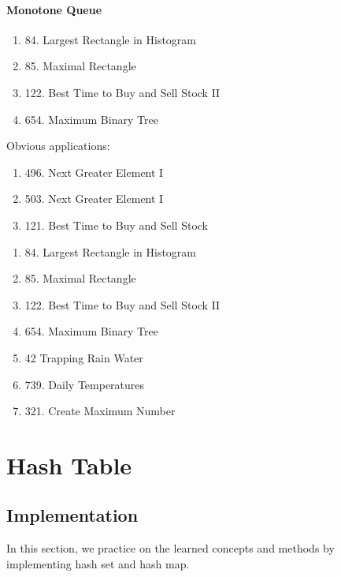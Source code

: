 \documentclass[../main.tex]{subfiles}
\begin{document}
\paragraph{Monotone Queue}
\begin{enumerate}
    \item 84. Largest Rectangle in Histogram
    \item 85. Maximal Rectangle
    \item 122. Best Time to Buy and Sell Stock II
    \item 654. Maximum Binary Tree
\end{enumerate}
Obvious applications:
\begin{enumerate}
    \item 496. Next Greater Element I
    \item 503. Next Greater Element I
    \item 121. Best Time to Buy and Sell Stock
\end{enumerate}

\begin{enumerate}
    \item 84. Largest Rectangle in Histogram
    \item 85. Maximal Rectangle
    \item 122. Best Time to Buy and Sell Stock II
    \item 654. Maximum Binary Tree
    \item 42 Trapping Rain Water
    \item 739. Daily Temperatures
    \item 321. Create Maximum Number
\end{enumerate}

\section{Hash Table}
\label{chapter_hashmap}

\subsection{Implementation}
In this section, we practice on the learned concepts and methods by implementing hash set and hash map.
\end{document}
